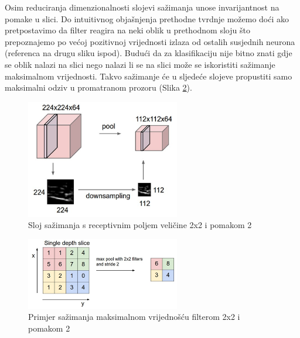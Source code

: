 \documentclass[times, utf8, proizvoljni, numeric]{fer}
\begin{document}
Osim reduciranja dimenzionalnosti slojevi sažimanja unose invarijantnost na pomake u slici. Do intuitivnog objašnjenja prethodne tvrdnje možemo doći ako pretpostavimo da filter reagira na neki oblik u prethodnom sloju što prepoznajemo po većoj pozitivnoj vrijednosti izlaza od ostalih susjednih neurona (referenca na drugu sliku ispod). Budući da za klasifikaciju nije bitno znati gdje se oblik nalazi na slici nego nalazi li se na slici može se iskoristiti sažimanje maksimalnom vrijednosti. Takvo sažimanje će u sljedeće slojeve propustiti samo maksimalni odziv u promatranom prozoru (Slika \ref{fg:sazimanje2}).

\begin{figure}[H]
	\begin{center}
		\captionsetup{justification=centering}
		\includegraphics[width=0.6\textwidth]{./imgs/sazimanje.png}
		\caption{Sloj sažimanja s receptivnim poljem veličine 2x2 i pomakom 2 \cite{CS231n}}
		\label{fg:sazimanje}
	\end{center}
\end{figure}


\begin{figure}[H]
	\begin{center}
		\captionsetup{justification=centering}
		\includegraphics[width=0.6\textwidth]{./imgs/sazimanje2.png}
		\caption{Primjer sažimanja maksimalnom vrijednošću filterom 2x2 i pomakom 2 \cite{CS231n}}
		\label{fg:sazimanje2}
	\end{center}
\end{figure}
\end{document}
